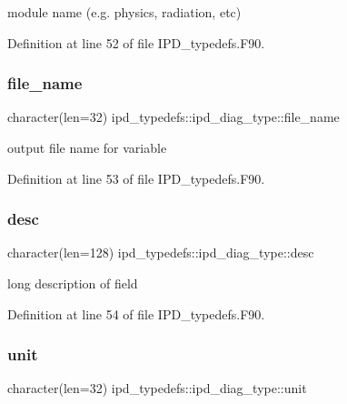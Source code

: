module name (e.\+g. physics, radiation, etc) 



Definition at line 52 of file I\+P\+D\+\_\+typedefs.\+F90.

\mbox{\label{structipd__typedefs_1_1ipd__diag__type_a4938ec86843edc8864192dfe4b061bd5}} 
\subsubsection{file\+\_\+name}
{\footnotesize\ttfamily character(len=32) ipd\+\_\+typedefs\+::ipd\+\_\+diag\+\_\+type\+::file\+\_\+name}



output file name for variable 



Definition at line 53 of file I\+P\+D\+\_\+typedefs.\+F90.

\mbox{\label{structipd__typedefs_1_1ipd__diag__type_aa584021a964cb1e398fea54999fb5a19}} 
\subsubsection{desc}
{\footnotesize\ttfamily character(len=128) ipd\+\_\+typedefs\+::ipd\+\_\+diag\+\_\+type\+::desc}



long description of field 



Definition at line 54 of file I\+P\+D\+\_\+typedefs.\+F90.

\mbox{\label{structipd__typedefs_1_1ipd__diag__type_a91232bcb4c638f0fabe4deb97c6baffa}} 
\subsubsection{unit}
{\footnotesize\ttfamily character(len=32) ipd\+\_\+typedefs\+::ipd\+\_\+diag\+\_\+type\+::unit}



